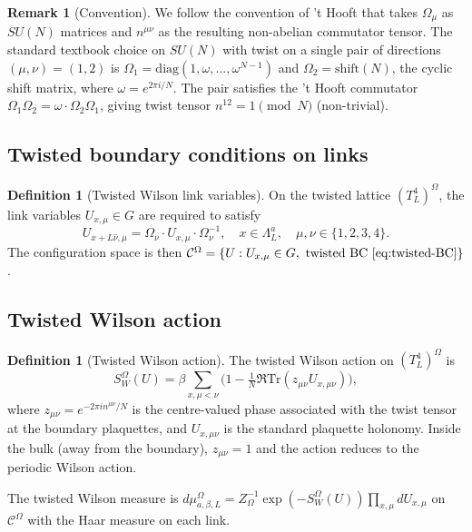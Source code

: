\documentclass[11pt,a4paper]{amsart}
\theoremstyle{definition}
\newtheorem{definition}[theorem]{Definition}
\newtheorem{remark}[theorem]{Remark}
\newcommand{\Tr}{\mathrm{Tr}}
\begin{document}
\begin{remark}[Convention]\label{rem:convention}
We follow the convention of 't Hooft \cite{tHooft1979} that takes
$\Omega_\mu$ as $SU(N)$ matrices and $n^{\mu\nu}$ as the resulting
non-abelian commutator tensor. The standard textbook choice on
$SU(N)$ with twist on a single pair of directions $(\mu,\nu) = (1,2)$
is $\Omega_1 = \mathrm{diag}(1,\omega,\ldots,\omega^{N-1})$ and
$\Omega_2 = \mathrm{shift}(N)$, the cyclic shift matrix, where
$\omega = e^{2\pi i / N}$. The pair satisfies the 't Hooft
commutator $\Omega_1 \Omega_2 = \omega \cdot \Omega_2 \Omega_1$, giving
twist tensor $n^{12} = 1 \pmod N$ (non-trivial).
\end{remark}

\subsection{Twisted boundary conditions on links}

\begin{definition}[Twisted Wilson link variables]\label{def:twisted-links}
On the twisted lattice $(T^4_L)^\Omega$, the link variables
$U_{x,\mu}\in G$ are required to satisfy
\begin{equation}\label{eq:twisted-BC}
U_{x + L\hat\nu, \mu} = \Omega_\nu \cdot U_{x,\mu} \cdot \Omega_\nu^{-1},
\quad x \in \Lambda_L^a, \quad \mu, \nu \in \{1,2,3,4\}.
\end{equation}
The configuration space is then
$\mathcal C^\Omega = \{U : U_{x,\mu}\in G,\ \text{twisted BC}~\eqref{eq:twisted-BC}\}$.
\end{definition}

\subsection{Twisted Wilson action}
\begin{definition}[Twisted Wilson action]\label{def:twisted-Wilson}
The twisted Wilson action on $(T^4_L)^\Omega$ is
\begin{equation}\label{eq:twisted-Wilson-action}
S_W^\Omega(U) = \beta \sum_{x,\mu<\nu}
\bigl(1 - \tfrac{1}{N}\Re\Tr(z_{\mu\nu} U_{x,\mu\nu})\bigr),
\end{equation}
where $z_{\mu\nu} = e^{-2\pi i n^{\mu\nu}/N}$ is the centre-valued
phase associated with the twist tensor at the boundary plaquettes,
and $U_{x,\mu\nu}$ is the standard plaquette holonomy. Inside the bulk
(away from the boundary), $z_{\mu\nu} = 1$ and the action reduces to
the periodic Wilson action.

The twisted Wilson measure is
$d\mu^\Omega_{a,\beta,L} = Z_\Omega^{-1} \exp(-S_W^\Omega(U))
\prod_{x,\mu} dU_{x,\mu}$ on $\mathcal C^\Omega$ with the Haar measure on
each link.
\end{definition}
\end{document}
